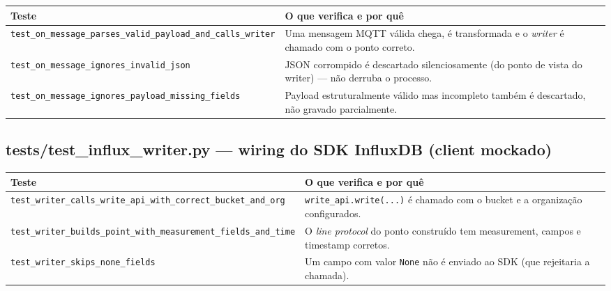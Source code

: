 \documentclass[10pt,a4paper]{article}
\begin{document}
\begin{center}
\begin{longtable}{L{5cm}L{9.5cm}}
\toprule
\textbf{Teste} & \textbf{O que verifica e por quê} \\
\midrule
\endhead
\texttt{test\_\allowbreak on\_\allowbreak message\_\allowbreak parses\_\allowbreak valid\_\allowbreak payload\_\allowbreak and\_\allowbreak calls\_\allowbreak writer} & Uma mensagem MQTT válida chega, é transformada e o \textit{writer} é chamado com o ponto correto. \\
\texttt{test\_\allowbreak on\_\allowbreak message\_\allowbreak ignores\_\allowbreak invalid\_\allowbreak json} & JSON corrompido é descartado silenciosamente (do ponto de vista do writer) — não derruba o processo. \\
\texttt{test\_\allowbreak on\_\allowbreak message\_\allowbreak ignores\_\allowbreak payload\_\allowbreak missing\_\allowbreak fields} & Payload estruturalmente válido mas incompleto também é descartado, não gravado parcialmente. \\
\bottomrule
\end{longtable}
\end{center}

\subsection{tests/test\_\allowbreak influx\_\allowbreak writer.py --- wiring do SDK InfluxDB (client mockado)}

\begin{center}
\begin{longtable}{L{5cm}L{9.5cm}}
\toprule
\textbf{Teste} & \textbf{O que verifica e por quê} \\
\midrule
\endhead
\texttt{test\_\allowbreak writer\_\allowbreak calls\_\allowbreak write\_\allowbreak api\_\allowbreak with\_\allowbreak correct\_\allowbreak bucket\_\allowbreak and\_\allowbreak org} & \texttt{write\_\allowbreak api.write(...)} é chamado com o bucket e a organização configurados. \\
\texttt{test\_\allowbreak writer\_\allowbreak builds\_\allowbreak point\_\allowbreak with\_\allowbreak measurement\_\allowbreak fields\_\allowbreak and\_\allowbreak time} & O \textit{line protocol} do ponto construído tem measurement, campos e timestamp corretos. \\
\texttt{test\_\allowbreak writer\_\allowbreak skips\_\allowbreak none\_\allowbreak fields} & Um campo com valor \texttt{None} não é enviado ao SDK (que rejeitaria a chamada). \\
\bottomrule
\end{longtable}
\end{center}
\end{document}

